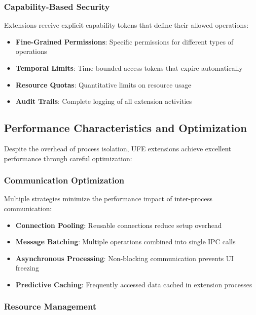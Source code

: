 \subsubsection{Capability-Based Security}

Extensions receive explicit capability tokens that define their allowed operations:

\begin{itemize}
    \item \textbf{Fine-Grained Permissions}: Specific permissions for different types of operations
    \item \textbf{Temporal Limits}: Time-bounded access tokens that expire automatically
    \item \textbf{Resource Quotas}: Quantitative limits on resource usage
    \item \textbf{Audit Trails}: Complete logging of all extension activities
\end{itemize}

\subsection{Performance Characteristics and Optimization}

Despite the overhead of process isolation, UFE extensions achieve excellent performance through careful optimization:

\subsubsection{Communication Optimization}

Multiple strategies minimize the performance impact of inter-process communication:

\begin{itemize}
    \item \textbf{Connection Pooling}: Reusable connections reduce setup overhead
    \item \textbf{Message Batching}: Multiple operations combined into single IPC calls
    \item \textbf{Asynchronous Processing}: Non-blocking communication prevents UI freezing
    \item \textbf{Predictive Caching}: Frequently accessed data cached in extension processes
\end{itemize}

\subsubsection{Resource Management}

